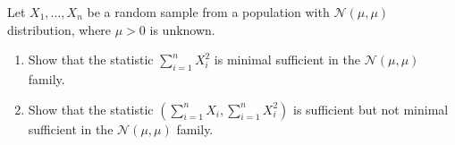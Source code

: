 
\begin{exercise}

Let $X_1,\dots,X_n$ be a random sample from a population with $\mathcal{N}(\mu,\mu)$
distribution, where $\mu > 0$ is unknown.

\begin{enumerate}[label = (\alph*)]
  \item Show that the statistic $\sum_{i=1}^n X_i^2$ is minimal sufficient
  in the $\mathcal{N}(\mu,\mu)$ family.
  \item Show that the statistic $\left(\sum_{i=1}^n X_i, \sum_{i=1}^n X_i^2\right)$ is sufficient
  but not minimal sufficient in the $\mathcal{N}(\mu,\mu)$ family.
\end{enumerate}

\end{exercise}


